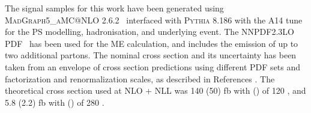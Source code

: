 	The signal samples for this work have been generated using \textsc{MadGraph5\_aMC@NLO 2.6.2}~\cite{madgraph} interfaced with \textsc{Pythia 8.186} with the \textsc{A14} tune~\cite{ATL-PHYS-PUB-2014-021} for the \ac{PS} modelling, hadronisation, and underlying event. The \textsc{NNPDF2.3LO} \ac{PDF}~\cite{BALL2013244} has been used for the \ac{ME} calculation, and includes the emission of up to two additional partons. The nominal cross section and its uncertainty has been taken from an envelope of cross section predictions using different \ac{PDF} sets and factorization and renormalization scales, as described in References \cite{cite-1,Beenakker:1999xh,Bozzi_2007,Fuks_2014,Fiaschi_2018}.
	The theoretical cross section used at \ac{NLO + NLL} was 140 (50) fb with \stauL\stauL (\stauR\stauR) of 120 \gev, and 5.8 (2.2) fb with \stauL\stauL (\stauR\stauR) of 280 \gev.~\cite{PhysRevD.101.032009}

